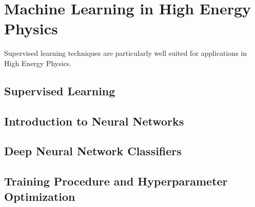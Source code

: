 \chapter{Machine Learning in High Energy Physics}
\label{chap:ml}

Supervised learning techniques are particularly well suited for applications in High Energy Physics.

\section{Supervised Learning}

\section{Introduction to Neural Networks}

\section{Deep Neural Network Classifiers}

\section{Training Procedure and Hyperparameter Optimization}

